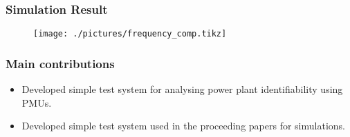 \begin{frame}
	\frametitle{Simulation Result}
	\begin{figure}
		\texttt{[image: ./pictures/frequency\_comp.tikz]}
	\end{figure}
\end{frame}
\begin{frame}
	\frametitle{Main contributions}
	\begin{itemize}
		\item Developed simple test system for analysing power plant identifiability using PMUs.
		\item Developed simple test system used in the proceeding papers for simulations.
	\end{itemize}
\end{frame}
